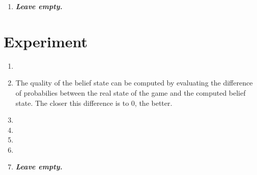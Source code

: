 \documentclass{article}
\begin{document}
\begin{enumerate}[label=\alph*.,leftmargin=*]
    \item \textbf{\textit{Leave empty.}}
\end{enumerate}

\section{Experiment}

\begin{enumerate}[label=\alph*.,leftmargin=*]
    \item 
    \item The quality of the belief state can be computed by evaluating the difference of probabilies between the real state of the game and the computed belief state.
    The closer this difference is to 0, the better.
    \item
    \item
    \item
    \item
    \item \textbf{\textit{Leave empty.}}
\end{enumerate}

\end{document}
